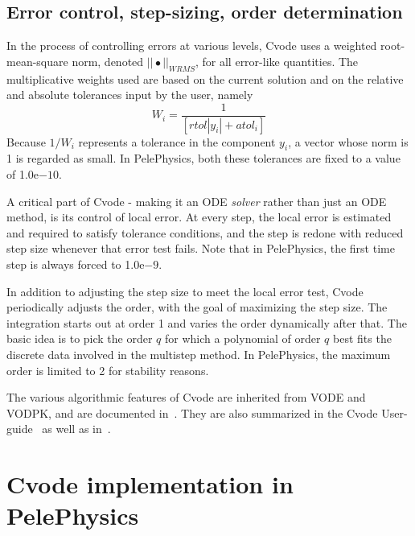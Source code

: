 \documentclass[12pt]{article}
\begin{document}
\subsection{Error control, step-sizing, order determination}

In the process of controlling errors at various levels, Cvode uses  a  weighted  root-mean-square norm, denoted $|| \bullet ||_{WRMS}$, for all error-like quantities. The multiplicative weights used are based on the current solution and on the relative and absolute tolerances input by the user, namely
\begin{equation}
W_i= \frac{1}{[rtol |y_i|+atol_i]}
\end{equation}
Because $1/W_i$ represents a tolerance in the component $y_i$, a vector whose norm is 1 is regarded as small. In PelePhysics, both these tolerances are fixed to a value of 1.0e$-10$.

A critical part of Cvode - making it an ODE \textit{solver} rather than just an ODE method, is its control  of  local  error. At  every  step,  the  local  error  is  estimated  and  required to satisfy tolerance conditions, and the step is redone with reduced step size whenever that error test fails. Note that in PelePhysics, the first time step is always forced to 1.0e$-9$.

In addition to adjusting the step size to meet the local error test, Cvode periodically adjusts the order, with the goal of maximizing the step size. The integration starts out at order 1 and varies the order dynamically after that. The basic idea is to pick the order $q$ for which a polynomial of order $q$ best fits the discrete data involved in the multistep method. In PelePhysics, the maximum order is limited to 2 for stability reasons.

The various algorithmic features of Cvode are inherited from VODE and VODPK, and are documented in~\cite{VODE:1989,brown1990hybrid}.  They are also summarized in the Cvode User-guide~\cite{CVODE:2019} as well as in~\cite{hindmarsh2005sundials}.



\section{Cvode implementation in PelePhysics}

\end{document}
